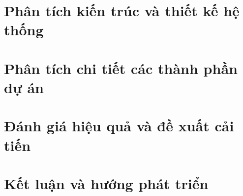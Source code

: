 \documentclass[12pt,a4paper]{report}
\begin{document}
\chapter{Phân tích kiến trúc và thiết kế hệ thống}


\chapter{Phân tích chi tiết các thành phần dự án}


\chapter{Đánh giá hiệu quả và đề xuất cải tiến}


\chapter{Kết luận và hướng phát triển}

\end{document}

